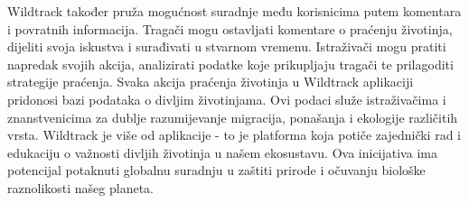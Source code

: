		Wildtrack također pruža mogućnost suradnje među korisnicima putem komentara i povratnih informacija. Tragači mogu ostavljati komentare o praćenju životinja, dijeliti svoja iskustva i surađivati u stvarnom vremenu. Istraživači mogu pratiti napredak svojih akcija, analizirati podatke koje prikupljaju tragači te prilagoditi strategije praćenja. Svaka akcija praćenja životinja u Wildtrack aplikaciji pridonosi bazi podataka o divljim životinjama. Ovi podaci služe istraživačima i znanstvenicima za dublje razumijevanje migracija, ponašanja i ekologije različitih vrsta. Wildtrack je više od aplikacije - to je platforma koja potiče zajednički rad i edukaciju o važnosti divljih životinja u našem ekosustavu. Ova inicijativa ima potencijal potaknuti globalnu suradnju u zaštiti prirode i očuvanju biološke raznolikosti našeg planeta. \newline
		
		
		
		
	